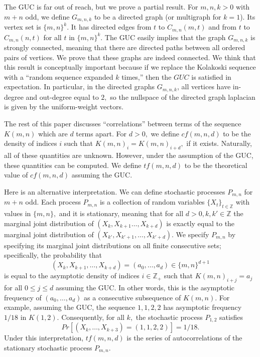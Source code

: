 \documentclass[11pt]{amsart} %
\begin{document}
The GUC is far out of reach, but we prove a partial result. For $m, n, k > 0$ with $m+n$ odd, we define $G_{m, n, k}$ to be a directed graph (or multigraph for $k=1$). Its vertex set is $\{m, n\}^k.$ It has directed edges from $t$ to $C_{m, n}(m, t)$ and from $t$ to $C_{m, n}(n, t)$  for all $t$ in $\{m, n\}^k.$ The GUC easily implies that the graph $G_{m, n, k}$ is strongly connected, meaning that there are directed paths between all ordered pairs of vertices. We prove that these graphs are indeed connected. 
We think that this result is conceptually important because if we replace the Kolakoski sequence with a ``random sequence expanded $k$ times,'' then the $GUC$ is satisfied in expectation. In particular, in the directed graphs $G_{m, n, k}$, all vertices have in-degree and out-degree equal to $2,$ so the nullspace of the directed graph laplacian is given by the uniform-weight vectors.

The rest of this paper discusses ``correlations'' between terms of the sequence $K(m, n)$ which are $d$ terms apart. For $d>0,$ we define $cf(m,n,d)$ to be the density of indices $i$ such that $K(m, n)_i = K(m, n)_{i+d},$ if it exists. Naturally, all of these quantities are unknown. However, under the assumption of the GUC, these quantities can be computed. We define $tf(m, n, d)$ to be the theoretical value of $cf(m,n,d)$ assuming the GUC.

 Here is an alternative interpretation. We can define stochastic processes $P_{m, n}$ for $m+n$ odd. Each process $P_{m,n}$ is a collection of random variables $\{X_t\}_{t \in \mathbb{Z}}$ with values in $\{m,n\},$ and it is stationary, meaning that for all $d>0, k, k' \in \mathbb{Z}$ the marginal joint distribution of $(X_k,X_{k+1}\ldots, X_{k+d})$ is exactly equal to the marginal joint distribution of $(X_{k'}, X_{k' + 1}, \ldots, X_{k' + d}).$ We specify $P_{m,n}$ by specifying its marginal joint distributions on all finite consecutive sets; specifically, the probability that 
 \[(X_k, X_{k+1}, \ldots, X_{k+d}) = (a_0, \ldots, a_d) \in \{m,n\}^{d+1}\]
is equal to the asymptotic density of indices $i \in \mathbb{Z}_+$ such that $K(m,n)_{i + j} = a_j$ for all $0 \le j \le d$ assuming the GUC. In other words, this is the asymptotic frequency of $(a_0, \ldots, a_d)$ as a consecutive subsequence of $K(m,n).$ For example, assuming the GUC, the sequence $1,1,2,2$ has asymptotic frequency $1/18$ in $K(1,2).$ Consequently, for all $k,$ the stochastic process $P_{1,2}$ satisfies
\[ Pr[(X_k, \ldots, X_{k+3}) = (1,1,2,2)] = 1/18.\]
Under this interpretation, $tf(m,n,d)$ is the series of autocorrelations of the stationary stochastic process $P_{m,n}$. 
\end{document}
